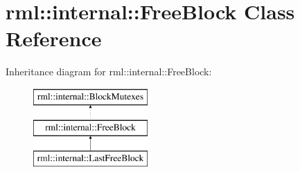 \hypertarget{classrml_1_1internal_1_1FreeBlock}{}\section{rml\+:\+:internal\+:\+:Free\+Block Class Reference}
\label{classrml_1_1internal_1_1FreeBlock}
Inheritance diagram for rml\+:\+:internal\+:\+:Free\+Block\+:\begin{figure}[H]
\begin{center}
\leavevmode
\includegraphics[height=3.000000cm]{classrml_1_1internal_1_1FreeBlock}
\end{center}
\end{figure}
